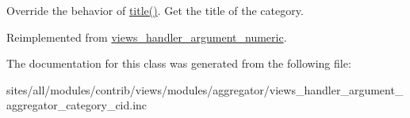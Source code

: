 Override the behavior of \hyperlink{classviews__handler__argument__numeric_480758dbcde899b5483b091e51e2bf39}{title()}. Get the title of the category. 

Reimplemented from \hyperlink{classviews__handler__argument__numeric_5c6f566b06bad6057e92f15d82311c7b}{views\_\-handler\_\-argument\_\-numeric}.

The documentation for this class was generated from the following file:\begin{CompactItemize}
\item 
sites/all/modules/contrib/views/modules/aggregator/views\_\-handler\_\-argument\_\-aggregator\_\-category\_\-cid.inc\end{CompactItemize}
